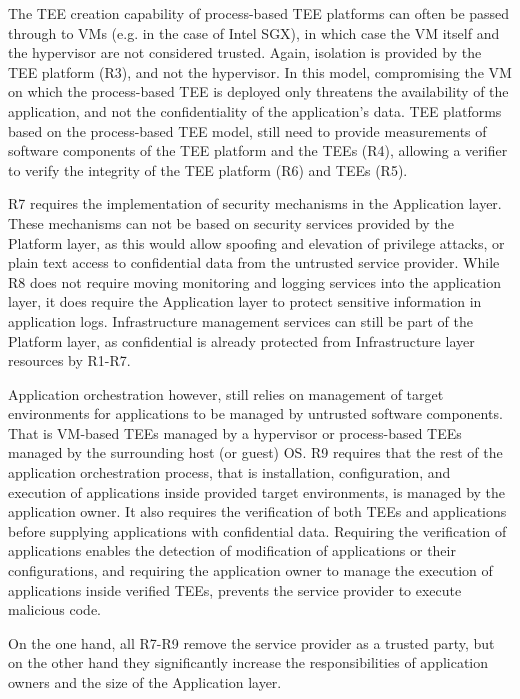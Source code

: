 The TEE creation capability of process-based TEE platforms can often be passed
through to VMs (e.g. in the case of Intel SGX), in which case the VM itself and
the hypervisor are not considered trusted. Again, isolation is provided by the
TEE platform (R3), and not the hypervisor. In this model, compromising the VM on
which the process-based TEE is deployed only threatens the availability of the
application, and not the confidentiality of the application's data. TEE
platforms based on the process-based TEE model, still need to provide
measurements of software components of the TEE platform and the TEEs (R4),
allowing a verifier to verify the integrity of the TEE platform (R6) and TEEs
(R5).

R7 requires the implementation of security mechanisms in the Application layer.
These mechanisms can not be based on security services provided by the Platform
layer, as this would allow spoofing and elevation of privilege attacks, or plain
text access to confidential data from the untrusted service provider. While R8
does not require moving monitoring and logging services into the application
layer, it does require the Application layer to protect sensitive information in
application logs. Infrastructure management services can still be part of the
Platform layer, as confidential is already protected from Infrastructure layer
resources by R1-R7.

Application orchestration however, still relies on management of target
environments for applications to be managed by untrusted software components.
That is VM-based TEEs managed by a hypervisor or process-based TEEs managed by
the surrounding host (or guest) OS. R9 requires that the rest of the application
orchestration process, that is installation, configuration, and execution of
applications inside provided target environments, is managed by the application
owner. It also requires the verification of both TEEs and applications before
supplying applications with confidential data. Requiring the verification of
applications enables the detection of modification of applications or their
configurations, and requiring the application owner to manage the execution of
applications inside verified TEEs, prevents the service provider to execute
malicious code.

On the one hand, all R7-R9 remove the service provider as a trusted party, but
on the other hand they significantly increase the responsibilities of
application owners and the size of the Application layer.


